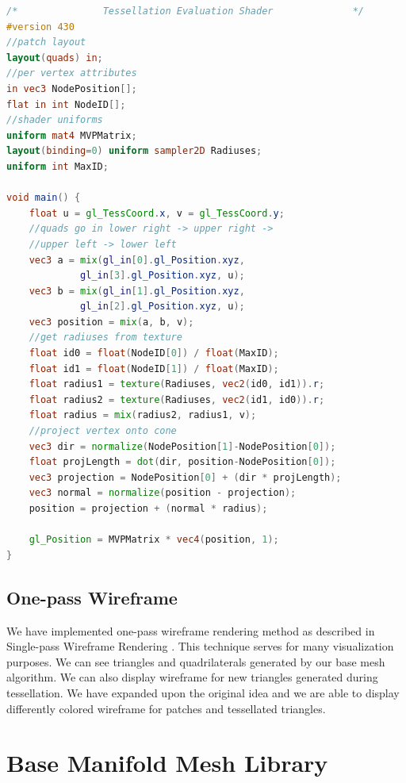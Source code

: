 \linespread{1.2}
\begin{lstlisting}[language=GLSL,caption={Tessellation evaluation shader projecting tessellated vertices onto truncated cone.},label={lst:tess_proj}]
/*               Tessellation Evaluation Shader              */ 
#version 430
//patch layout
layout(quads) in;
//per vertex attributes
in vec3 NodePosition[];
flat in int NodeID[];
//shader uniforms
uniform mat4 MVPMatrix;
layout(binding=0) uniform sampler2D Radiuses;
uniform int MaxID;

void main() {
    float u = gl_TessCoord.x, v = gl_TessCoord.y;
	//quads go in lower right -> upper right ->
	//upper left -> lower left
	vec3 a = mix(gl_in[0].gl_Position.xyz,
		     gl_in[3].gl_Position.xyz, u);
	vec3 b = mix(gl_in[1].gl_Position.xyz,
		     gl_in[2].gl_Position.xyz, u);
	vec3 position = mix(a, b, v);
	//get radiuses from texture
	float id0 = float(NodeID[0]) / float(MaxID);
	float id1 = float(NodeID[1]) / float(MaxID);
	float radius1 = texture(Radiuses, vec2(id0, id1)).r;
	float radius2 = texture(Radiuses, vec2(id1, id0)).r;
	float radius = mix(radius2, radius1, v);
	//project vertex onto cone
	vec3 dir = normalize(NodePosition[1]-NodePosition[0]);
	float projLength = dot(dir, position-NodePosition[0]);
	vec3 projection = NodePosition[0] + (dir * projLength);
	vec3 normal = normalize(position - projection);
	position = projection + (normal * radius);

	gl_Position = MVPMatrix * vec4(position, 1);
}
\end{lstlisting} 
\linespread{1.5}

\subsection{One-pass Wireframe}

We have implemented one-pass wireframe rendering method as described in Single-pass Wireframe Rendering \cite{wireframe}.
This technique serves for many visualization purposes.
We can see triangles and quadrilaterals generated by our base mesh algorithm.
We can also display wireframe for new triangles generated during tessellation.
We have expanded upon the original idea and we are able to display differently colored wireframe for patches and tessellated triangles.

\section{Base Manifold Mesh Library}

